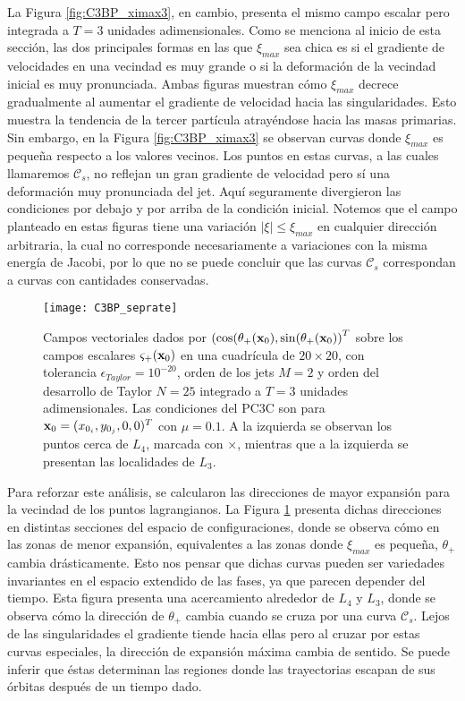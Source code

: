 La Figura \ref{fig:C3BP_ximax3}, en cambio, presenta el mismo campo escalar pero integrada a $T = 3$ unidades adimensionales. Como se menciona al inicio de esta sección, las dos principales formas en las que $\xi_{max}$ sea chica es si el gradiente de velocidades en una vecindad es muy grande o si la deformación de la vecindad inicial es muy pronunciada. Ambas figuras muestran cómo $\xi_{max}$ decrece gradualmente al aumentar el gradiente de velocidad hacia las singularidades. Esto muestra la tendencia de la tercer partícula atrayéndose hacia las masas primarias. Sin embargo, en la Figura \ref{fig:C3BP_ximax3} se observan curvas donde $\xi_{max}$ es pequeña  respecto a los valores vecinos. Los puntos en estas curvas, a las cuales llamaremos $\mathcal{C}_s$, no reflejan un gran gradiente de velocidad pero sí una deformación muy pronunciada del jet. Aquí seguramente divergieron las condiciones por debajo y por arriba de la condición inicial. Notemos que el campo planteado en estas figuras tiene una variación $\lvert \xi \rvert \leq \xi_{max}$ en cualquier dirección arbitraria, la cual no corresponde necesariamente a variaciones con la misma energía de Jacobi, por lo que no se puede concluir que las curvas $\mathcal{C}_s$ correspondan a curvas con cantidades conservadas.

\begin{figure}
 \centering
 \texttt{[image: C3BP\_seprate]}
 \caption{Campos vectoriales dados por $\left( \cos(\theta_{+}(\mathbf{x}_0), \sin(\theta_{+}(\mathbf{x}_0) \right)^T$ sobre los campos escalares $\varsigma_{+}(\mathbf{x}_0)$ en una cuadrícula de $20 \times 20$, con tolerancia $\epsilon_{Taylor} = 10^{-20}$, orden de los jets $M=2$ y orden del desarrollo de Taylor $N = 25$ integrado a $T = 3$ unidades adimensionales. Las condiciones del PC3C son para $\mathbf{x}_0 = (x_{0_i}, y_{0_j}, 0, 0)^T$ con $\mu = 0.1$. A la izquierda se observan los puntos cerca de $L_4$, marcada con $\times$, mientras que a la izquierda se presentan las localidades de $L_3$.}
 \label{fig:C3BP_seprate3}
\end{figure}

Para reforzar este análisis, se calcularon las direcciones de mayor expansión para la vecindad de los puntos lagrangianos. La Figura \ref{fig:C3BP_seprate3} presenta dichas direcciones en distintas secciones del espacio de configuraciones, donde se observa cómo en las zonas de menor expansión, equivalentes a las zonas donde $\xi_{max}$ es pequeña,  $\theta_{+}$ cambia drásticamente. Esto nos pensar que dichas curvas pueden ser variedades invariantes en el espacio extendido de las fases, ya que parecen depender del tiempo. Esta figura presenta una acercamiento alrededor de $L_4$ y $L_3$, donde se observa cómo la dirección de  $\theta_{+}$ cambia cuando se cruza por una curva $\mathcal{C}_s$. Lejos de las singularidades el gradiente tiende hacia ellas pero al cruzar por estas curvas especiales, la dirección de expansión máxima cambia de sentido. Se puede inferir que éstas determinan las regiones donde las trayectorias escapan de sus órbitas después de un tiempo dado.

